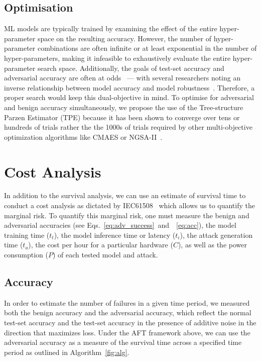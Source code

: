 \documentclass[conference]{IEEEtran}
\begin{document}
{\subsection{Optimisation}
\label{optimisation}

ML models are typically trained by examining the effect of the entire hyper-parameter space on the resulting accuracy. However, the number of hyper-parameter combinations are often infinite or at least exponential in the number of hyper-parameters,
making it infeasible to exhaustively evaluate the entire hyper-parameter search space. Additionally, the goals of test-set accuracy and adversarial accuracy are often at odds~\cite{carlini_towards_2017} --- with several researchers noting an inverse relationship between model accuracy and model robustness~\cite{carlini_towards_2017,meyers,dohmatob_generalized_2019}. Therefore, a proper search would keep this dual-objective in mind.
To optimise for adversarial and benign accuracy simultaneously, we propose the use of the Tree-structure Parzen Estimator (TPE) because it has been shown to converge  over tens or hundreds of trials rather the the 1000s of trials required by other multi-objective optimization algorithms like CMAES or NGSA-II~\cite{ozaki2020multiobjective,optuna,tpe_params}.




\section{Cost Analysis}
\label{cost}

In addition to the survival analysis, we can use an estimate of survival time to conduct a cost analysis as dictated by IEC61508~\cite{IEC61508} which allows us to quantify the marginal risk. To quantify this marginal risk, one must measure the benign and adversarial accuracies (see Eqs.~\ref{eq:adv_success}~and~~\ref{eq:acc}), the model training time ($t_{t}$), the model inference time or latency ($t_{i}$), the attack generation time ($t_{a}$), the cost per hour for a particular hardware ($C$), as well as the power consumption ($P$) of each tested model and attack. 


\subsection{Accuracy}

In order to estimate the number of failures in a given time period, we measured both the benign accuracy and the adversarial accuracy, which reflect the normal test-set accuracy and the test-set accuracy in the presence of additive noise in the direction that maximizes loss. Under the AFT framework above, we can use the adversarial accuracy as a measure of the survival time across a specified time period as outlined in Algorithm~\ref{fig:alg}.


}
\end{document}
